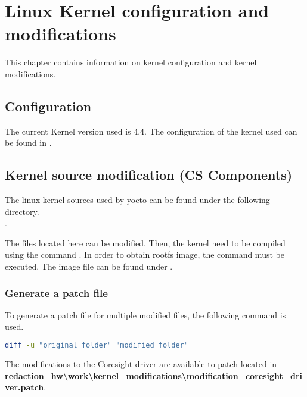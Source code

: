 \chapter{Linux Kernel configuration and modifications}
\label{chap:kernel_modifications}
This chapter contains information on kernel configuration and kernel modifications.
\section{Configuration}
The current Kernel version used is 4.4. The configuration of the kernel used can be found in .


\section{Kernel source modification (CS Components)}
The linux kernel sources used by yocto can be found under the following directory.\\  \newline 
{}.
\vspace{1em}

The files located here can be modified. Then, the kernel need to be compiled using the command . In order to obtain rootfs image, the command  must be executed. The image file can be found under .

\vspace{1em}
\subsection{Generate a patch file}
To generate a patch file for multiple modified files, the following command is used. 
\begin{lstlisting}[language=bash]
diff -u "original_folder" "modified_folder"
\end{lstlisting}

The modifications to the Coresight driver are available to patch located in \\ \textbf{redaction\_hw\textbackslash work\textbackslash kernel\_modifications\textbackslash modification\_coresight\_driver.patch}.

